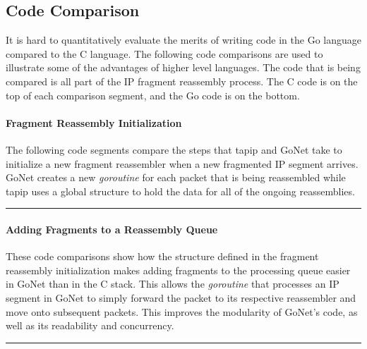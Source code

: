 \documentclass[twocolumn,10pt]{article}
\begin{document}
\subsection{Code Comparison}
It is hard to quantitatively evaluate the merits of writing code in the Go language compared to the C language. The following code comparisons are used to illustrate some of the advantages of higher level languages. The code that is being compared is all part of the IP fragment reassembly process. The C code is on the top of each comparison segment, and the Go code is on the bottom.

\paragraph{Fragment Reassembly Initialization}
The following code segments compare the steps that tapip and GoNet take to initialize a new fragment reassembler when a new fragmented IP segment arrives. GoNet creates a new \textit{goroutine} for each packet that is being reassembled while tapip uses a global structure to hold the data for all of the ongoing reassemblies. 

\begin{minipage}{0.47\linewidth}
	
\end{minipage}
\hrule
\begin{minipage}[t]{0.47\linewidth}
	
\end{minipage}
\vspace{-4mm}

\paragraph{Adding Fragments to a Reassembly Queue}
These code comparisons show how the structure defined in the fragment reassembly initialization makes adding fragments to the processing queue easier in GoNet than in the C stack. This allows the \textit{goroutine} that processes an IP segment in GoNet to simply forward the packet to its respective reassembler and move onto subsequent packets. This improves the modularity of GoNet's code, as well as its readability and concurrency. 

\begin{minipage}{0.47\linewidth}
	
\end{minipage}
\hrule
\begin{minipage}[t]{0.47\linewidth}
	
\end{minipage}
\vspace{-4mm}
\end{document}
